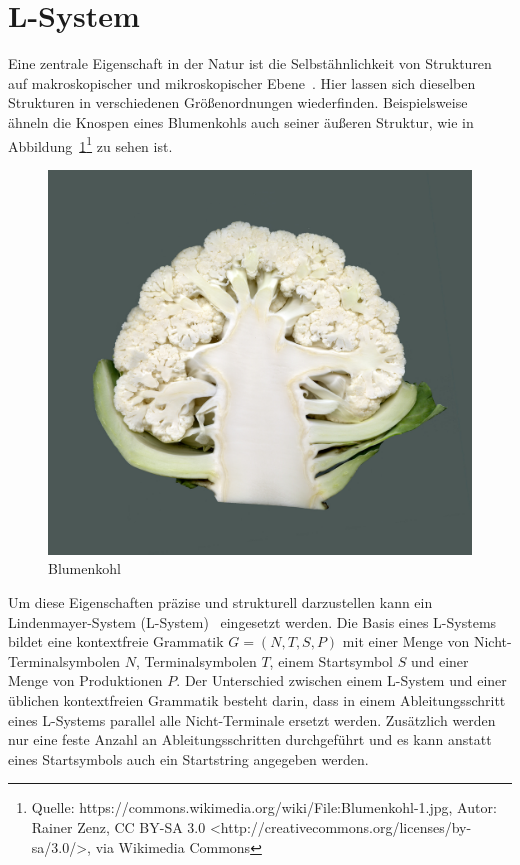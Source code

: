 \section{L-System}
Eine zentrale Eigenschaft in der Natur ist die Selbstähnlichkeit von Strukturen auf makroskopischer und mikroskopischer Ebene~\cite{Shaker2016}. %
Hier lassen sich dieselben Strukturen in verschiedenen Größenordnungen wiederfinden. %
Beispielsweise ähneln die Knospen eines Blumenkohls auch seiner äußeren Struktur, wie in Abbildung~\ref{fig:Blumenkohl}\footnote{Quelle: {https://commons.wikimedia.org/wiki/File:Blumenkohl-1.jpg}, Autor: Rainer Zenz, CC BY-SA 3.0 <http://creativecommons.org/licenses/by-sa/3.0/>, via Wikimedia Commons} zu sehen ist.
\begin{figure}[ht]
    \centering
    \includegraphics[width=0.5\linewidth]{chapters/02_Grundlagen/L_System/Blumenkohl-1.jpg}
    \caption{Blumenkohl}\label{fig:Blumenkohl}
\end{figure}

Um diese Eigenschaften präzise und strukturell darzustellen kann ein Lindenmayer-System (L-System)~\cite{lindenmayer1990} eingesetzt werden.
Die Basis eines L-Systems bildet eine kontextfreie Grammatik $G=(N,T,S,P)$ mit einer Menge von Nicht-Terminalsymbolen $N$, Terminalsymbolen $T$, einem Startsymbol $S$ und einer Menge von Produktionen $P$.
Der Unterschied zwischen einem L-System und einer üblichen kontextfreien Grammatik besteht darin, dass in einem Ableitungsschritt eines L-Systems parallel alle Nicht-Terminale ersetzt werden.
Zusätzlich werden nur eine feste Anzahl an Ableitungsschritten durchgeführt und es kann anstatt eines Startsymbols auch ein Startstring angegeben werden.


